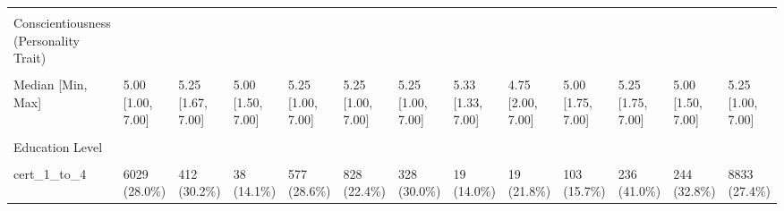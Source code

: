 \documentclass[
  single column]{article}
\begin{document}
\begin{landscape}
\begin{longtable}[t]{lllllllllllll}
\cellcolor{gray!10}{Missing} & \cellcolor{gray!10}{18 (0.1\%)} & \cellcolor{gray!10}{0 (0\%)} & \cellcolor{gray!10}{0 (0\%)} & \cellcolor{gray!10}{3 (0.1\%)} & \cellcolor{gray!10}{2 (0.1\%)} & \cellcolor{gray!10}{1 (0.1\%)} & \cellcolor{gray!10}{0 (0\%)} & \cellcolor{gray!10}{0 (0\%)} & \cellcolor{gray!10}{29 (4.4\%)} & \cellcolor{gray!10}{0 (0\%)} & \cellcolor{gray!10}{1 (0.1\%)} & \cellcolor{gray!10}{54 \vphantom{1} (0.2\%)}\\
Conscientiousness (Personality Trait) &  &  &  &  &  &  &  &  &  &  &  & \\
\cellcolor{gray!10}{Mean (SD)} & \cellcolor{gray!10}{5.01 (1.11)} & \cellcolor{gray!10}{5.21 (1.01)} & \cellcolor{gray!10}{5.06 (1.11)} & \cellcolor{gray!10}{5.22 (1.07)} & \cellcolor{gray!10}{5.09 (1.04)} & \cellcolor{gray!10}{5.09 (1.04)} & \cellcolor{gray!10}{5.25 (1.02)} & \cellcolor{gray!10}{4.91 (1.16)} & \cellcolor{gray!10}{5.02 (1.08)} & \cellcolor{gray!10}{5.15 (1.01)} & \cellcolor{gray!10}{4.91 (1.17)} & \cellcolor{gray!10}{5.05 (1.09)}\\
\addlinespace
Median [Min, Max] & 5.00 [1.00, 7.00] & 5.25 [1.67, 7.00] & 5.00 [1.50, 7.00] & 5.25 [1.00, 7.00] & 5.25 [1.00, 7.00] & 5.25 [1.00, 7.00] & 5.33 [1.33, 7.00] & 4.75 [2.00, 7.00] & 5.00 [1.75, 7.00] & 5.25 [1.75, 7.00] & 5.00 [1.50, 7.00] & 5.25 [1.00, 7.00]\\
\cellcolor{gray!10}{Missing} & \cellcolor{gray!10}{66 (0.3\%)} & \cellcolor{gray!10}{3 (0.2\%)} & \cellcolor{gray!10}{0 (0\%)} & \cellcolor{gray!10}{7 (0.3\%)} & \cellcolor{gray!10}{18 (0.5\%)} & \cellcolor{gray!10}{1 (0.1\%)} & \cellcolor{gray!10}{0 (0\%)} & \cellcolor{gray!10}{0 (0\%)} & \cellcolor{gray!10}{3 (0.5\%)} & \cellcolor{gray!10}{4 (0.7\%)} & \cellcolor{gray!10}{4 (0.5\%)} & \cellcolor{gray!10}{106 (0.3\%)}\\
Education Level &  &  &  &  &  &  &  &  &  &  &  & \\
\cellcolor{gray!10}{no\_qualification} & \cellcolor{gray!10}{322 (1.5\%)} & \cellcolor{gray!10}{15 (1.1\%)} & \cellcolor{gray!10}{1 (0.4\%)} & \cellcolor{gray!10}{24 (1.2\%)} & \cellcolor{gray!10}{41 (1.1\%)} & \cellcolor{gray!10}{30 (2.7\%)} & \cellcolor{gray!10}{0 (0\%)} & \cellcolor{gray!10}{2 (2.3\%)} & \cellcolor{gray!10}{26 (4.0\%)} & \cellcolor{gray!10}{8 (1.4\%)} & \cellcolor{gray!10}{23 (3.1\%)} & \cellcolor{gray!10}{492 (1.5\%)}\\
cert\_1\_to\_4 & 6029 (28.0\%) & 412 (30.2\%) & 38 (14.1\%) & 577 (28.6\%) & 828 (22.4\%) & 328 (30.0\%) & 19 (14.0\%) & 19 (21.8\%) & 103 (15.7\%) & 236 (41.0\%) & 244 (32.8\%) & 8833 (27.4\%)\\

\end{longtable}
\end{landscape}
\end{document}
